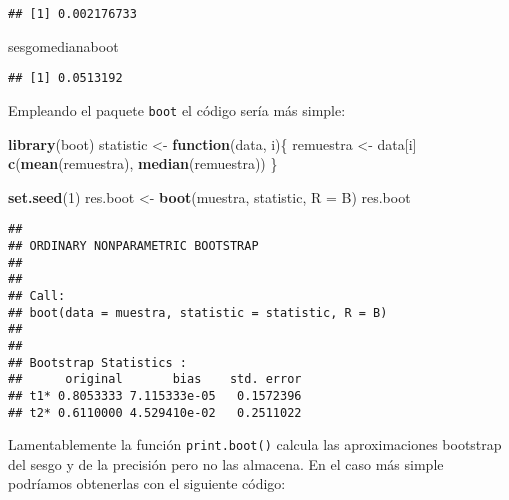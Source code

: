 \documentclass[
]{book}
\newenvironment{Shaded}{\begin{snugshade}}{\end{snugshade}}
\newcommand{\ControlFlowTok}[1]{\textcolor[rgb]{0.13,0.29,0.53}{\textbf{#1}}}
\newcommand{\DataTypeTok}[1]{\textcolor[rgb]{0.13,0.29,0.53}{#1}}
\newcommand{\DecValTok}[1]{\textcolor[rgb]{0.00,0.00,0.81}{#1}}
\newcommand{\KeywordTok}[1]{\textcolor[rgb]{0.13,0.29,0.53}{\textbf{#1}}}
\newcommand{\NormalTok}[1]{#1}
\newcommand{\OperatorTok}[1]{\textcolor[rgb]{0.81,0.36,0.00}{\textbf{#1}}}
\newcommand{\OtherTok}[1]{\textcolor[rgb]{0.56,0.35,0.01}{#1}}
\newcommand{\StringTok}[1]{\textcolor[rgb]{0.31,0.60,0.02}{#1}}
\theoremstyle{break}
\theoremstyle{definition}
\theoremstyle{definition}
\theoremstyle{definition}
\theoremstyle{remark}
\begin{document}
\begin{verbatim}
## [1] 0.002176733
\end{verbatim}

\begin{Shaded}
\begin{Highlighting}[]
\NormalTok{sesgomedianaboot}
\end{Highlighting}
\end{Shaded}

\begin{verbatim}
## [1] 0.0513192
\end{verbatim}

Empleando el paquete \texttt{boot} el código sería más simple:

\begin{Shaded}
\begin{Highlighting}[]
\KeywordTok{library}\NormalTok{(boot)}
\NormalTok{statistic <-}\StringTok{ }\ControlFlowTok{function}\NormalTok{(data, i)\{}
\NormalTok{  remuestra <-}\StringTok{ }\NormalTok{data[i]}
  \KeywordTok{c}\NormalTok{(}\KeywordTok{mean}\NormalTok{(remuestra), }\KeywordTok{median}\NormalTok{(remuestra))}
\NormalTok{\}}

\KeywordTok{set.seed}\NormalTok{(}\DecValTok{1}\NormalTok{)}
\NormalTok{res.boot <-}\StringTok{ }\KeywordTok{boot}\NormalTok{(muestra, statistic, }\DataTypeTok{R =}\NormalTok{ B)}
\NormalTok{res.boot}
\end{Highlighting}
\end{Shaded}

\begin{verbatim}
## 
## ORDINARY NONPARAMETRIC BOOTSTRAP
## 
## 
## Call:
## boot(data = muestra, statistic = statistic, R = B)
## 
## 
## Bootstrap Statistics :
##      original       bias    std. error
## t1* 0.8053333 7.115333e-05   0.1572396
## t2* 0.6110000 4.529410e-02   0.2511022
\end{verbatim}

Lamentablemente la función \texttt{print.boot()} calcula las aproximaciones
bootstrap del sesgo y de la precisión pero no las almacena.
En el caso más simple podríamos obtenerlas con el siguiente código:

\begin{Shaded}
\end{Shaded}
\end{document}
